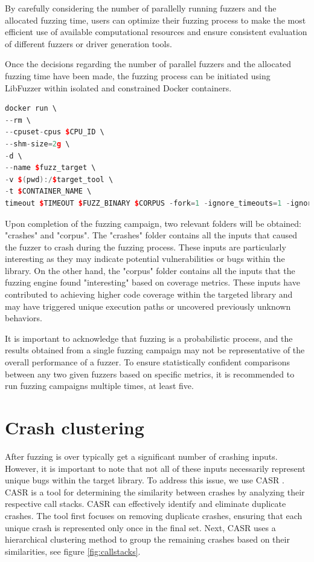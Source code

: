 \documentclass[a4paper,11pt,oneside]{report}
\begin{document}
By carefully considering the number of parallelly running fuzzers 
and the allocated fuzzing time, users can optimize their fuzzing 
process to make the most efficient use of available computational
resources and ensure consistent evaluation of different fuzzers or
driver generation tools. 

Once the decisions regarding the number of parallel fuzzers and 
the allocated fuzzing time have been made, the fuzzing process 
can be initiated using LibFuzzer within isolated and constrained
Docker containers.

\begin{lstlisting}[language={c++}]
docker run \
--rm \
--cpuset-cpus $CPU_ID \
--shm-size=2g \
-d \
--name $fuzz_target \
-v $(pwd):/$target_tool \
-t $CONTAINER_NAME \
timeout $TIMEOUT $FUZZ_BINARY $CORPUS -fork=1 -ignore_timeouts=1 -ignore_crashes=1 -ignore_ooms=1 -artifact_prefix=$CRASHES
\end{lstlisting}


Upon completion of the fuzzing campaign, two relevant folders will
be obtained: "crashes" and "corpus". The "crashes" folder contains 
all the inputs that caused the fuzzer to crash during the fuzzing 
process. These inputs are particularly interesting as they may 
indicate potential vulnerabilities or bugs within the library.
On the other hand, the "corpus" folder contains all the inputs 
that the fuzzing engine found "interesting" based on coverage 
metrics. These inputs have contributed to achieving higher code 
coverage within the targeted library and may have triggered unique 
execution paths or uncovered previously unknown behaviors.

It is important to acknowledge that fuzzing is a probabilistic 
process, and the results obtained from a single fuzzing campaign
may not be representative of the overall performance of a fuzzer. 
To ensure statistically confident comparisons between any two 
given fuzzers based on specific metrics, it is recommended to run 
fuzzing campaigns multiple times, at least five.

\section{Crash clustering}
After fuzzing is over typically get a significant number of crashing inputs.
However, it is important to note that not all of these inputs necessarily
represent unique bugs within the target library. To address this issue, we 
use CASR \cite{casr}. CASR is a tool for determining the similarity 
between crashes by analyzing their respective call stacks. CASR can
effectively identify and eliminate duplicate crashes. The tool first 
focuses on removing duplicate crashes, ensuring that each unique crash is 
represented only once in the final set. Next, CASR uses a hierarchical 
clustering method to group the remaining crashes based on their
similarities, see figure \ref{fig:callstacks}. 
\end{document}
